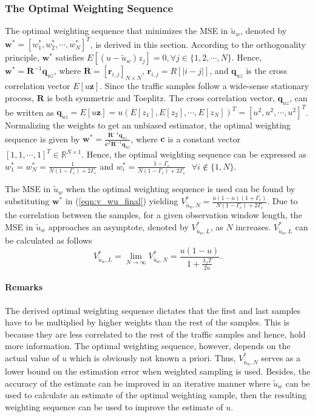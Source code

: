 \documentclass[11pt,draftclsnofoot,journal,onecolumn]{IEEEtran}
\begin{document}
\subsubsection{The Optimal Weighting Sequence}
\label{sec:opt_weight_seq}

The optimal weighting sequence that minimizes the MSE in $\tilde{u}_w$, denoted by $\mathbf{w}^* = [w_{1}^*, w_{2}^*,\cdots,w_{N}^*]^{T}$, is derived in this section. According to the orthogonality principle, $\mathbf{w}^*$ satisfies $E[(u-\tilde{u}_w)z_{j}]=0, \forall j \in\{1,2,\cdots,N\}$. Hence, $\mathbf{w}^*=\mathbf{R}^{-1}\mathbf{q}_{uz}$, where $\mathbf{R}=[\mathbf{r}_{i,j}]_{N\times N}$, $\mathbf{r}_{i,j}=R[|i-j|]$, and $\mathbf{q}_{uz}$ is the cross correlation vector $E[u\boldsymbol{z}]$. Since the traffic samples follow a wide-sense stationary process, $\mathbf{R}$ is both symmetric and Toeplitz. The cross correlation vector, $\mathbf{q}_{uz}$, can be written as $\mathbf{q}_{uz}=E[u\boldsymbol{z}]=u(E[z_1], E[z_2],\cdots,E[z_N])^T=[u^2, u^2,\cdots,u^2]^{T}$. Normalizing the weights to get an unbiased estimator, the optimal weighting sequence is given by $\mathbf{w}^*=\frac{\mathbf{R}^{-1}\mathbf{q}_{uz}}{\mathbf{c}^{T}\mathbf{R}^{-1}\mathbf{q}_{uz}}$, where $\mathbf{c}$ is a constant vector $[1, 1,\cdots,1]^{T}\in\mathbb{R}^{N\times 1}$. Hence, the optimal weighting sequence can be expressed as $w_{1}^* = w_{N}^* = \frac{1}{N(1-\Gamma_c)+2\Gamma_c}$ and $w_{i}^* = \frac{1-\Gamma_c}{N(1-\Gamma_c)+2\Gamma_c} \text{ } \forall i \notin \{1,N\}$.

The MSE in $\tilde{u}_w$ when the optimal weighting sequence is used can be found by substituting $\mathbf{w}^*$ in (\ref{eqn:v_wu_final}) yielding $V_{\tilde{u}_w,N}^* = \frac{u(1-u)(1+\Gamma_c)}{N(1-\Gamma_c)+2\Gamma_c}$. Due to the correlation between the samples, for a given observation window length, the MSE in $\tilde{u}_w$ approaches an asymptote, denoted by $V_{\tilde{u}_w,L}^*$, as $N$ increases. $V_{\tilde{u}_w,L}^*$ can be calculated as follows
\begin{equation}
V_{\tilde{u}_w,L}^* = \lim_{N\to\infty} V_{\tilde{u}_w,N}^* = \frac{u(1-u)}{1+\frac{\lambda_f T}{2u}}.
\label{eq;MSE_w_inf}
\end{equation}
\paragraph*{Remarks}

The derived optimal weighting sequence dictates that the first and last samples have to be multiplied by higher weights than the rest of the samples. This is because they are less correlated to the rest of the traffic samples and hence, hold more information. The optimal weighting sequence, however, depends on the actual value of $u$ which is obviously not known a priori. Thus, $V_{\tilde{u}_w,N}^*$ serves as a lower bound on the estimation error when weighted sampling is used. Besides, the accuracy of the estimate can be improved in an iterative manner where $\tilde{u}_w$ can be used to calculate an estimate of the optimal weighting sample, then the resulting weighting sequence can be used to improve the estimate of $u$.
\end{document}
